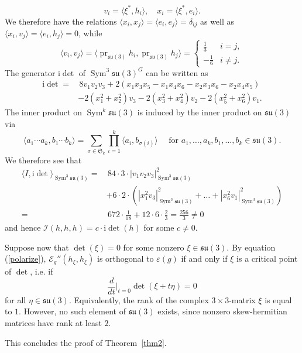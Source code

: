 \documentclass[12pt]{scrartcl}
\theoremstyle{plain}
\theoremstyle{definition}
\newcommand{\Sym}{\operatorname{Sym}}%
\newcommand{\Sl}{\mathfrak{S}}%
\newcommand{\su}{\mathfrak{su}}%
\newcommand{\pr}{\operatorname{pr}}%
\renewcommand{\i}{\mathrm{i}}%
\newcommand{\Eop}{\mathcal{E}}%
\begin{document}
\[v_i=\langle\xi^\ast,h_i\rangle,\quad x_i=\langle\xi^\ast, e_i\rangle.\]
We therefore have the relations $\langle x_i,x_j\rangle=\langle e_i,e_j\rangle=\delta_{ij}$ as well as $\langle x_i,v_j\rangle=\langle e_i,h_j\rangle=0$, while
\[\langle v_i,v_j\rangle=\langle\pr_{\su(3)}h_i,\pr_{\su(3)}h_j\rangle=\begin{cases}
                                                                        \frac{1}{3}&i=j,\\
                                                                        -\frac{1}{6}&i\neq j.
                                                                       \end{cases}\]
The generator $\i\det$ of $\Sym^3\su(3)^G$ can be written as
\begin{align*}
\i\det=&\,8v_1v_2v_3+2(x_1x_3x_5-x_1x_4x_6-x_2x_3x_6-x_2x_4x_5)\\
&-2(x_1^2+x_2^2)v_3-2(x_3^2+x_4^2)v_2-2(x_5^2+x_6^2)v_1.
\end{align*}
The inner product on $\Sym^k\su(3)$ is induced by the inner product on $\su(3)$ via
\[\langle a_1\cdots a_k,b_1\cdots b_k\rangle=\sum_{\sigma\in\Sl_k}\prod_{i=1}^k\langle a_i,b_{\sigma(i)}\rangle\quad\text{ for }a_1,\ldots,a_k,b_1,\ldots,b_k\in\su(3).\]
We therefore see that
\begin{align*}
\langle I,\i\det\rangle_{\Sym^3\su(3)}=&\,84\cdot3\cdot|v_1v_2v_3|^2_{\Sym^3\su(3)}\\
&+6\cdot2\cdot(|x_1^2v_3|^2_{\Sym^3\su(3)}+\ldots+|x_6^2v_1|^2_{\Sym^3\su(3)})\\
=&\,672\cdot\frac{1}{18}+12\cdot6\cdot\frac{2}{3}=\frac{256}{3}\neq0
\end{align*}
and hence $\mathcal{I}(h,h,h)=c\cdot\i\det(h)$ for some $c\neq0$.

Suppose now that $\det(\xi)=0$ for some nonzero $\xi\in\su(3)$. By equation (\ref{polarize}), $\Eop_g''(h_\xi,h_\xi)$ is orthogonal to $\varepsilon(g)$ if and only if $\xi$ is a critical point of $\det$, i.e. if
\[\frac{d}{dt}\big|_{t=0}\det(\xi+t\eta)=0\]
for all $\eta\in\su(3)$. Equivalently, the rank of the complex $3\times3$-matrix $\xi$ is equal to $1$. However, no such element of $\su(3)$ exists, since nonzero skew-hermitian matrices have rank at least $2$.

This concludes the proof of Theorem~\ref{thm2}.

\clearpage
\end{document}
